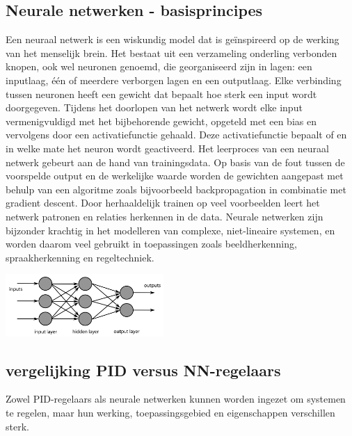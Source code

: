 \subsection{Neurale netwerken - basisprincipes}
Een neuraal netwerk is een wiskundig model dat is geïnspireerd op de werking van het menselijk brein. Het bestaat uit een verzameling onderling verbonden knopen, ook wel neuronen genoemd, die georganiseerd zijn in lagen: een inputlaag, één of meerdere verborgen lagen en een outputlaag. Elke verbinding tussen neuronen heeft een gewicht dat bepaalt hoe sterk een input wordt doorgegeven. Tijdens het doorlopen van het netwerk wordt elke input vermenigvuldigd met het bijbehorende gewicht, opgeteld met een bias en vervolgens door een activatiefunctie gehaald. Deze activatiefunctie bepaalt of en in welke mate het neuron wordt geactiveerd. Het leerproces van een neuraal netwerk gebeurt aan de hand van trainingsdata. Op basis van de fout tussen de voorspelde output en de werkelijke waarde worden de gewichten aangepast met behulp van een algoritme zoals bijvoorbeeld backpropagation in combinatie met gradient descent. Door herhaaldelijk trainen op veel voorbeelden leert het netwerk patronen en relaties herkennen in de data. Neurale netwerken zijn bijzonder krachtig in het modelleren van complexe, niet-lineaire systemen, en worden daarom veel gebruikt in toepassingen zoals beeldherkenning, spraakherkenning en regeltechniek.
\begin{center}
\centering
\includegraphics[width=0.45\textwidth]{./afbeeldingen/Neuraalnetwerkpng.png}
\label{fig:Illustratie_neuraal_netwerk}
\end{center}
\subsection{vergelijking PID versus NN-regelaars}
Zowel PID-regelaars als neurale netwerken kunnen worden ingezet om systemen te regelen, maar hun werking, toepassingsgebied en eigenschappen verschillen sterk.
